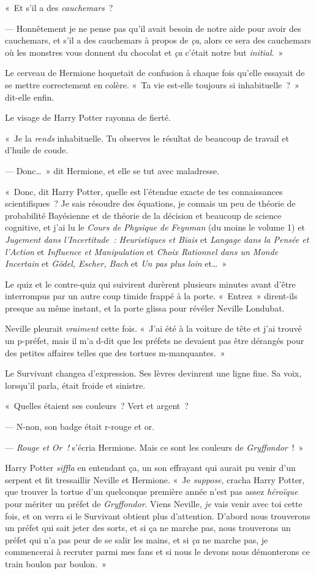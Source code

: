 «~Et s'il a des \emph{cauchemars}~?

--- Honnêtement je ne pense pas qu'il avait besoin de notre aide pour avoir des cauchemars, et s'il a des cauchemars à propos de \emph{ça}, alors ce sera des cauchemars où les monstres vous donnent du chocolat et \emph{ça} c'était notre but \emph{initial}.~»

Le cerveau de Hermione hoquetait de confusion à chaque fois qu'elle essayait de se mettre correctement en colère. «~Ta vie est-elle toujours si inhabituelle~?~» dit-elle enfin.

Le visage de Harry Potter rayonna de fierté.

«~Je la \emph{rends} inhabituelle. Tu observes le résultat de beaucoup de travail et d'huile de coude.

--- Donc…~» dit Hermione, et elle se tut avec maladresse.

«~Donc, dit Harry Potter, quelle est l'étendue exacte de tes connaissances scientifiques~? Je sais résoudre des équations, je connais un peu de théorie de probabilité Bayésienne et de théorie de la décision et beaucoup de science cognitive, et j'ai lu le \emph{Cours de Physique de Feynman} (du moins le volume 1) et \emph{Jugement dans l'Incertitude~: Heuristiques et Biais} et \emph{Langage dans la Pensée et l'Action} et \emph{Influence et Manipulation} et \emph{Choix Rationnel dans un Monde Incertain} et \emph{Gödel, Escher, Bach} et \emph{Un pas plus loin} et…~»

Le quiz et le contre-quiz qui suivirent durèrent plusieurs minutes avant d'être interrompus par un autre coup timide frappé à la porte. «~Entrez~» dirent-ils presque au même instant, et la porte glissa pour révéler Neville Londubat.

Neville pleurait \emph{vraiment} cette fois. «~J'ai été à la voiture de tête et j'ai trouvé un p-préfet, mais il m'a d-dit que les préfets ne devaient pas être dérangés pour des petites affaires telles que des tortues m-manquantes.~»

Le Survivant changea d'expression. Ses lèvres devinrent une ligne fine. Sa voix, lorsqu'il parla, était froide et sinistre.

«~Quelles étaient ses couleurs~? Vert et argent~?

--- N-non, son badge était r-rouge et or.

--- \emph{Rouge et Or~!} s'écria Hermione. Mais ce sont les couleurs de \emph{Gryffondor}~!~»

Harry Potter \emph{siffla} en entendant ça, un son effrayant qui aurait pu venir d'un serpent et fit tressaillir Neville et Hermione. «~Je \emph{suppose}, cracha Harry Potter, que trouver la tortue d'un quelconque première année n'est pas assez \emph{héroïque} pour mériter un préfet de \emph{Gryffondor}. Viens Neville, \emph{je} vais venir avec toi cette fois, et on verra si le Survivant obtient plus d'attention. D'abord nous trouverons un préfet qui sait jeter des sorts, et si ça ne marche pas, nous trouverons un préfet qui n'a pas peur de se salir les mains, et si \emph{ça} ne marche pas, je commencerai à recruter parmi mes fans et si nous le devons nous démonterons ce train boulon par boulon.~»


